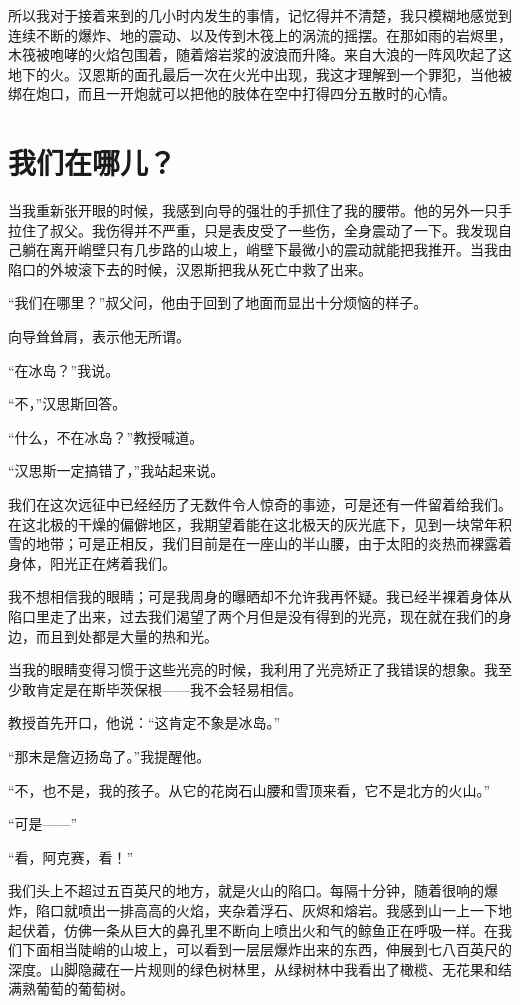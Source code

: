 \documentclass[10pt]{book}
\begin{document}
所以我对于接着来到的几小时内发生的事情，记忆得并不清楚，我只模糊地感觉到连续不断的爆炸、地的震动、以及传到木筏上的涡流的摇摆。在那如雨的岩烬里，木筏被咆哮的火焰包围着，随着熔岩浆的波浪而升降。来自大浪的一阵风吹起了这地下的火。汉恩斯的面孔最后一次在火光中出现，我这才理解到一个罪犯，当他被绑在炮口，而且一开炮就可以把他的肢体在空中打得四分五散时的心情。
\chapter{我们在哪儿？}
当我重新张开眼的时候，我感到向导的强壮的手抓住了我的腰带。他的另外一只手拉住了叔父。我伤得并不严重，只是表皮受了一些伤，全身震动了一下。我发现自己躺在离开峭壁只有几步路的山坡上，峭壁下最微小的震动就能把我推开。当我由陷口的外坡滚下去的时候，汉恩斯把我从死亡中救了出来。

“我们在哪里？”叔父问，他由于回到了地面而显出十分烦恼的样子。

向导耸耸肩，表示他无所谓。

“在冰岛？”我说。

“不，”汉思斯回答。

“什么，不在冰岛？”教授喊道。

“汉思斯一定搞错了，”我站起来说。

我们在这次远征中已经经历了无数件令人惊奇的事迹，可是还有一件留着给我们。在这北极的干燥的偏僻地区，我期望着能在这北极天的灰光底下，见到一块常年积雪的地带；可是正相反，我们目前是在一座山的半山腰，由于太阳的炎热而裸露着身体，阳光正在烤着我们。

我不想相信我的眼睛；可是我周身的曝晒却不允许我再怀疑。我已经半裸着身体从陷口里走了出来，过去我们渴望了两个月但是没有得到的光亮，现在就在我们的身边，而且到处都是大量的热和光。

当我的眼睛变得习惯于这些光亮的时候，我利用了光亮矫正了我错误的想象。我至少敢肯定是在斯毕茨保根——我不会轻易相信。

教授首先开口，他说：“这肯定不象是冰岛。”

“那末是詹迈扬岛了。”我提醒他。

“不，也不是，我的孩子。从它的花岗石山腰和雪顶来看，它不是北方的火山。”

“可是——”

“看，阿克赛，看！”

我们头上不超过五百英尺的地方，就是火山的陷口。每隔十分钟，随着很响的爆炸，陷口就喷出一排高高的火焰，夹杂着浮石、灰烬和熔岩。我感到山一上一下地起伏着，仿佛一条从巨大的鼻孔里不断向上喷出火和气的鲸鱼正在呼吸一样。在我们下面相当陡峭的山坡上，可以看到一层层爆炸出来的东西，伸展到七八百英尺的深度。山脚隐藏在一片规则的绿色树林里，从绿树林中我看出了橄榄、无花果和结满熟葡萄的葡萄树。
\end{document}
